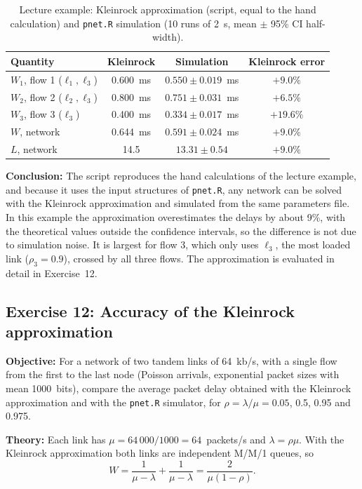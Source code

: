 ﻿\documentclass[12pt]{article}
\begin{document}
\begin{table}[H]
    \centering
    \caption{Lecture example: Kleinrock approximation (script, equal to the hand calculation) and \texttt{pnet.R} simulation (10 runs of 2~s, mean $\pm$ 95\% CI half-width).}
    \label{tab:kleinrock-example}
    \begin{tabular}{l|c|c|c}
        Quantity & Kleinrock & Simulation & Kleinrock error \\
        \hline
        $W_1$, flow 1 ($\ell_1,\ell_3$) & 0.600~ms & $0.550\pm0.019$~ms & $+9.0\%$ \\
        $W_2$, flow 2 ($\ell_2,\ell_3$) & 0.800~ms & $0.751\pm0.031$~ms & $+6.5\%$ \\
        $W_3$, flow 3 ($\ell_3$)        & 0.400~ms & $0.334\pm0.017$~ms & $+19.6\%$ \\
        $W$, network                    & 0.644~ms & $0.591\pm0.024$~ms & $+9.0\%$ \\
        $L$, network                    & 14.5     & $13.31\pm0.54$     & $+9.0\%$ \\
    \end{tabular}
\end{table}

\textbf{Conclusion:} The script reproduces the hand calculations of the
lecture example, and because it uses the input structures of \texttt{pnet.R},
any network can be solved with the Kleinrock approximation and simulated from
the same parameters file. In this example the approximation overestimates the
delays by about 9\%, with the theoretical values outside the confidence
intervals, so the difference is not due to simulation noise. It is largest for
flow 3, which only uses $\ell_3$, the most loaded link ($\rho_3=0.9$), crossed by
all three flows. The approximation is evaluated in detail in Exercise~12.

\subsection{Exercise 12: Accuracy of the Kleinrock approximation}

\textbf{Objective:} For a network of two tandem links of 64~kb/s, with a single
flow from the first to the last node (Poisson arrivals, exponential packet
sizes with mean 1000~bits), compare the average packet delay obtained with the
Kleinrock approximation and with the \texttt{pnet.R} simulator, for
$\rho=\lambda/\mu=0.05$, 0.5, 0.95 and 0.975.

\textbf{Theory:} Each link has $\mu=64\,000/1000=64$~packets/s and
$\lambda=\rho\mu$. With the Kleinrock approximation both links are independent
M/M/1 queues, so
\[
W=\frac{1}{\mu-\lambda}+\frac{1}{\mu-\lambda}=\frac{2}{\mu(1-\rho)} .
\]
\end{document}
